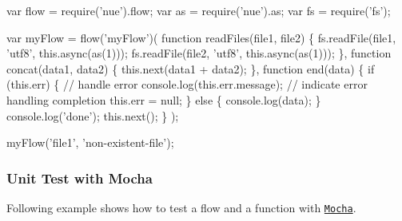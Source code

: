 \begin{DoxyCode}
var flow = require(\textcolor{stringliteral}{'nue'}).flow;
var as = require(\textcolor{stringliteral}{'nue'}).as;
var fs = require(\textcolor{stringliteral}{'fs'});

var myFlow = flow(\textcolor{stringliteral}{'myFlow'})(
  \textcolor{keyword}{function} readFiles(file1, file2) \{
    fs.readFile(file1, \textcolor{stringliteral}{'utf8'}, this.async(as(1)));
    fs.readFile(file2, \textcolor{stringliteral}{'utf8'}, this.async(as(1)));
  \},
  \textcolor{keyword}{function} concat(data1, data2) \{
    this.next(data1 + data2);
  \},
  \textcolor{keyword}{function} end(data) \{
    \textcolor{keywordflow}{if} (this.err) \{
      \textcolor{comment}{// handle error}
      console.log(this.err.message);
      \textcolor{comment}{// indicate error handling completion}
      this.err = null;
    \} \textcolor{keywordflow}{else} \{
      console.log(data);
    \}
    console.log(\textcolor{stringliteral}{'done'});
    this.next();
  \}
);

myFlow(\textcolor{stringliteral}{'file1'}, \textcolor{stringliteral}{'non-existent-file'});
\end{DoxyCode}


\subsubsection*{Unit Test with Mocha}

Following example shows how to test a flow and a function with \href{http://visionmedia.github.com/mocha/}{\tt Mocha}.


